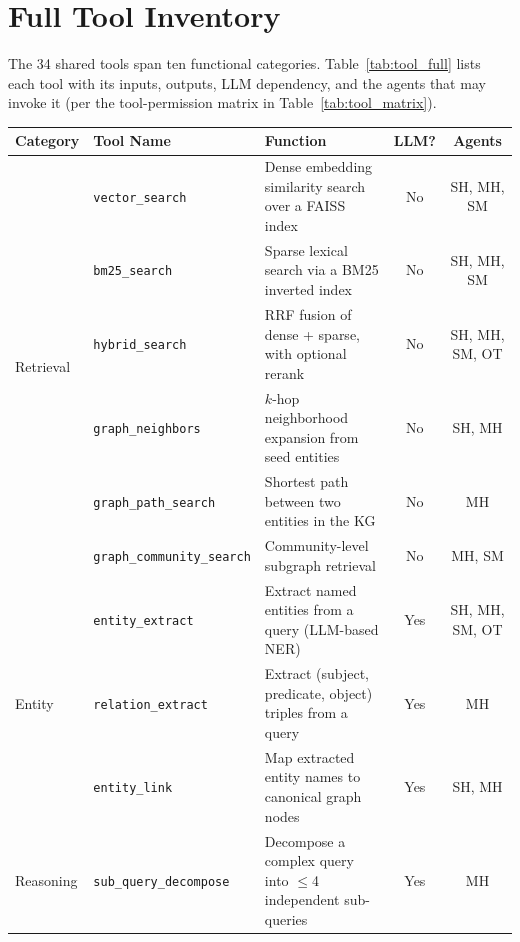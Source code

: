 \documentclass[11pt,a4paper]{article}
\newcommand{\tool}[1]{\texttt{\small #1}}
\begin{document}
\section{Full Tool Inventory}
\label{app:tools}

The 34 shared tools span ten functional categories.
Table~\ref{tab:tool_full} lists each tool with its inputs, outputs, LLM dependency, and the agents that may invoke it (per the tool-permission matrix in Table~\ref{tab:tool_matrix}).

\begin{table}[t]
\centering
\small
\begin{tabular}{@{}lllcc@{}}
\toprule
\textbf{Category} & \textbf{Tool Name} & \textbf{Function} & \textbf{LLM?} & \textbf{Agents} \\
\midrule
\multirow{6}{*}{Retrieval}
  & \tool{vector\_search}        & Dense embedding similarity search over a FAISS index         & No  & SH, MH, SM \\
  & \tool{bm25\_search}          & Sparse lexical search via a BM25 inverted index              & No  & SH, MH, SM \\
  & \tool{hybrid\_search}        & RRF fusion of dense + sparse, with optional rerank              & No  & SH, MH, SM, OT \\
  & \tool{graph\_neighbors}      & $k$-hop neighborhood expansion from seed entities          & No  & SH, MH \\
  & \tool{graph\_path\_search}   & Shortest path between two entities in the KG               & No  & MH \\
  & \tool{graph\_community\_search} & Community-level subgraph retrieval                       & No  & MH, SM \\
\midrule
\multirow{3}{*}{Entity}
  & \tool{entity\_extract}       & Extract named entities from a query (LLM-based NER)          & Yes & SH, MH, SM, OT \\
  & \tool{relation\_extract}     & Extract (subject, predicate, object) triples from a query    & Yes & MH \\
  & \tool{entity\_link}          & Map extracted entity names to canonical graph nodes        & Yes & SH, MH \\
\midrule
\multirow{3}{*}{Reasoning}
  & \tool{sub\_query\_decompose} & Decompose a complex query into $\le$4 independent sub-queries & Yes & MH \\

\end{tabular}
\end{table}
\end{document}
